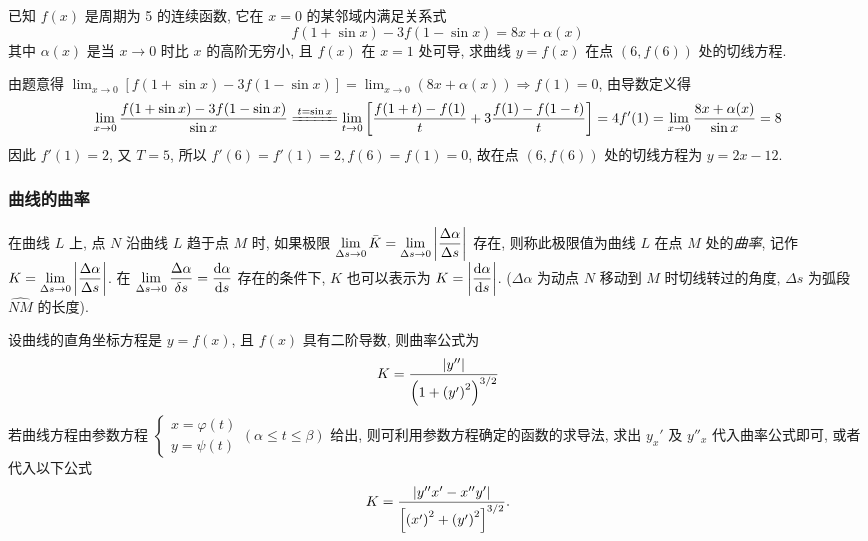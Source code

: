 \begin{example}
    已知 $f(x)$ 是周期为 5 的连续函数, 它在 $x=0$ 的某邻域内满足关系式 $$
    f(1+\sin x)-3f(1-\sin x)=8x+\alpha(x)
    $$
    其中 $\alpha(x)$ 是当 $x\to 0$ 时比 $x$ 的高阶无穷小, 且 $f(x)$ 在 $x=1$ 处可导, 求曲线 $y=f(x)$ 在点 $(6,f(6))$ 处的切线方程.
\end{example}
\begin{solution}
    由题意得 $\displaystyle \lim_{x \to 0}[f(1+\sin x)-3f(1-\sin x)]=\lim_{x \to 0}(8x+\alpha(x))\Rightarrow f(1)=0$, 由导数定义得 
    $$
    \lim_{x \to 0}\dfrac{f(1+\sin x)-3f(1-\sin x)}{\sin x}\xlongequal{t=\sin x}\lim_{t \to 0}\qty[\dfrac{f(1+t)-f(1)}{t}+3\dfrac{f(1)-f(1-t)}{t}]=4f'(1)=\lim_{x \to 0}\dfrac{8x+\alpha(x)}{\sin x}=8
    $$
    因此 $f'(1)=2$, 又 $T=5$, 所以 $f'(6)=f'(1)=2,f(6)=f(1)=0$, 故在点 $(6,f(6))$ 处的切线方程为 $y=2x-12.$
\end{solution}

\subsubsection{曲线的曲率}

\begin{definition}[曲率]
    在曲线 $L$ 上, 点 $N$ 沿曲线 $L$ 趋于点 $M$ 时, 如果极限 $\displaystyle\lim_{\Delta s\to0}\bar{K}=\lim_{\Delta s\to0}\qty|\dfrac{\Delta\alpha}{\Delta s}|$ 存在, 则称此极限值为曲线 $L$ 在点 $M$ 处的\textit{曲率}, 记作 $K=\displaystyle\lim_{\Delta s\to0}\qty|\dfrac{\Delta\alpha}{\Delta s}|$.
    在 $\displaystyle\lim_{\Delta s\to0}\dfrac{\Delta\alpha}{\delta s}=\dv{\alpha}{s}$ 存在的条件下, $K$ 也可以表示为 $K=\qty|\dfrac{\dd \alpha}{\dd s}|$. ($\Delta \alpha$ 为动点 $N$ 移动到 $M$ 时切线转过的角度, $\Delta s$ 为弧段 $\widehat{NM} $ 的长度).
\end{definition}

\begin{theorem}[曲率的计算公式]
    设曲线的直角坐标方程是 $y=f(x)$, 且 $f(x)$ 具有二阶导数, 则曲率公式为 $$K=\dfrac{|y''|}{\qty(1+\qty(y')^2)^{3/2}}$$
    若曲线方程由参数方程 $\begin{cases}
            x=\varphi(t) \\y=\psi(t)
        \end{cases}(\alpha \leqslant t\leqslant \beta)$ 给出, 则可利用参数方程确定的函数的求导法, 求出 $y_x'$ 及 $y''_x$ 代入曲率公式即可, 或者代入以下公式
        $$
        K=\dfrac{|y''x'-x''y'|}{\qty[\qty(x')^2+\qty(y')^2]^{3/2}}.
        $$
\end{theorem}

